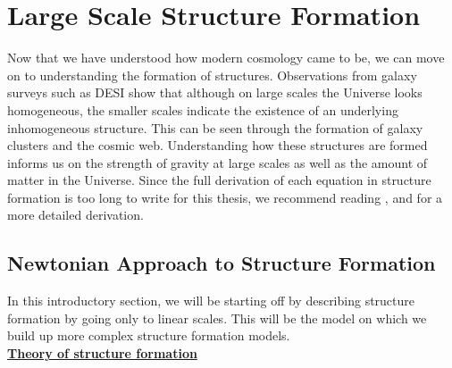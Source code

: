\section{Large Scale Structure Formation}

Now that we have understood how modern cosmology came to be, we can move on to understanding the formation of structures. Observations from galaxy surveys such as DESI show that 
although on large scales the Universe looks homogeneous, the smaller scales indicate the existence of an underlying inhomogeneous structure. This can be seen through the formation of galaxy clusters 
and the cosmic web. Understanding how these structures are formed informs us on the strength of gravity at large scales as well as the amount of matter in the Universe.
Since the full derivation of each equation in structure formation is too long to write for this thesis, we recommend reading \cite{Knobel_2013}, \cite{Dodelson_2003} and \cite{Peebles_1980} for a more detailed derivation.\\


\subsection{Newtonian Approach to Structure Formation} \label{sec:newton}

In this introductory section, we will be starting off by describing structure formation by going only to linear scales. This will be the model on which we build up more complex 
structure formation models. \\

\noindent \textbf{\underline{Theory of structure formation}} \\

